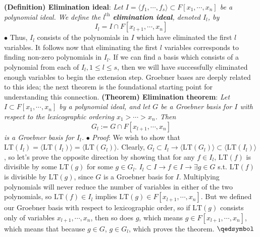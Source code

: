 \documentclass{article}
\begin{document}
\newline \newline
\textbf{(Definition) Elimination ideal}: \textit{Let $ I = \langle f_1, \cdots, f_s \rangle \subset F[x_1, \cdots, x_n] $ be a polynomial ideal. We define the $ l^{\text{th}} $ \textbf{elimination ideal}, denoted $ I_l $, by}
$$ I_l = I \cap F[x_{l + 1}, \cdots, x_n] $$
\indent $ \bullet $ Thus, $ I_l $ consists of the polynomials in $ I $ which have eliminated the first $ l $ variables.
\newline \newline
It follows now that eliminating the first $ l $ variables corresponds to finding non-zero polynomials in $ I_l $. If we can find a basis which consists of a polynomial from each of $ I_l, 1 \leq l \leq s $, then we will have successfully eliminated enough variables to begin the extension step. Groebner bases are deeply related to this idea; the next theorem is the foundational starting point for understanding this connection.
\newline \newline
\textbf{(Theorem) Elimination theorem}: \textit{Let $ I \subset F[x_1, \cdots, x_n] $ by a polynomial ideal, and let $ G $ be a Groebner basis for $ I $ with respect to the lexicographic ordering $ x_1 > \cdots > x_n $. Then}
$$ G_l := G \cap F[x_{l + 1}, \cdots, x_n] $$
\indent \textit{is a Groebner basis for $ I_l $.}
\newline
\indent $ \bullet $ \textit{Proof}: We wish to show that $ \text{LT}(I_l) = \langle \text{LT}(I_l) \rangle = \langle \text{LT}(G_l) \rangle $. Clearly, $ G_l \subset I_l \rightarrow \langle \text{LT}(G_l) \rangle \subset \langle \text{LT}(I_l) \rangle $, so let's prove the opposite direction by showing that for any $ f \in I_l $, $ \text{LT}(f) $ is divisible by some $ \text{LT}(g) $ for some $ g \in G_l $.
\newline
$ I_l \subset I \rightarrow f \in I \rightarrow \exists g \in G $ s.t. $ \text{LT}(f) $ is divisible by $ \text{LT}(g) $, since $ G $ is a Groebner basis for $ I $. Multiplying polynomials will never reduce the number of variables in either of the two polynomials, so $ \text{LT}(f) \in I_l $ implies $ \text{LT}(g) \in F[x_{l + 1}, \cdots, x_n] $. But we defined our Groebner basis with respect to lexicographic order, so if $ \text{LT}(g) $ consists only of variables $ x_{l + 1}, \cdots, x_n $, then so does $ g $, which means $ g \in F[x_{l + 1}, \cdots, x_n] $, which means that because $ g \in G $, $ g \in G_l $, which proves the theorem. $ \qedsymbol $
\end{document}
